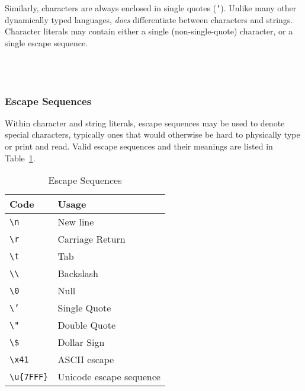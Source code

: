 Similarly, characters are always enclosed in single quotes (\texttt{'}).
Unlike many other dynamically typed languages, \Trilogy{} \emph{does} differentiate
between characters and strings. Character literals may contain either a
single (non-single-quote) character, or a single escape sequence.

\begin{bnf*}
     \\
     \\
\end{bnf*}

\subsubsection{Escape Sequences}
\label{sec:escapesequences}
\FloatBarrier

Within character and string literals, escape sequences may be used to denote
special characters, typically ones that would otherwise be hard to physically
type or print and read. Valid escape sequences and their meanings are listed
in Table~\ref{tab:escape}.

\begin{table}[h]
    \centering
\begin{tabular}[c]{ll}
    \hline
    \textbf{Code} & \textbf{Usage} \\
    \hline
    \texttt{\textbackslash n} & New line \\
    \texttt{\textbackslash r} & Carriage Return \\
    \texttt{\textbackslash t} & Tab \\
    \texttt{\textbackslash\textbackslash} & Backslash \\
    \texttt{\textbackslash 0} & Null \\
    \texttt{\textbackslash '} & Single Quote \\
    \texttt{\textbackslash "} & Double Quote \\
    \texttt{\textbackslash \$} & Dollar Sign \\ %
    \texttt{\textbackslash x41} & ASCII escape \\
    \texttt{\textbackslash u\{7FFF\}} & Unicode escape sequence \\
    \hline
\end{tabular}
\caption{\label{tab:escape}Escape Sequences}
\end{table}

